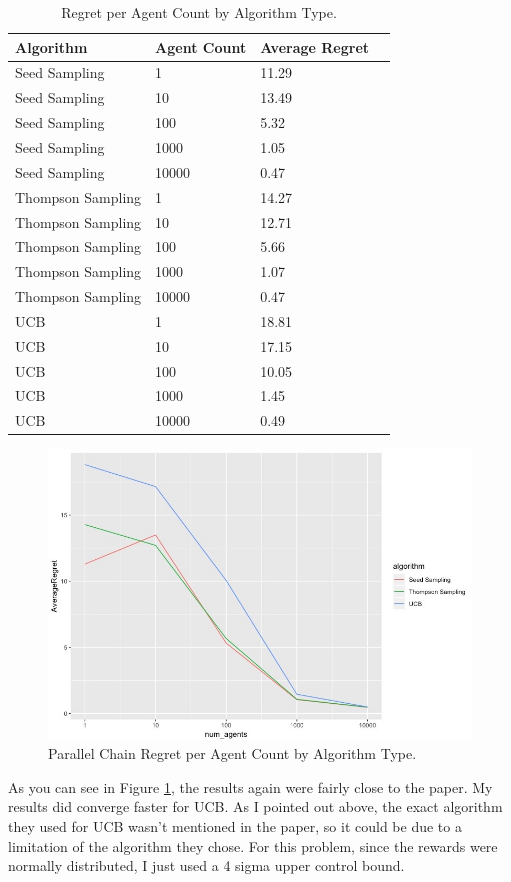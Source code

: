 \documentclass{article}
\begin{document}
\begin{table}[ht]
\caption{Regret per Agent Count by Algorithm Type.}
\label{pc_results_regret_by_algo-table}
\vskip 0.15in
\centering
\begin{tabular}{llll} 
\toprule 
Algorithm     & Agent Count       & Average Regret   \\ 
\midrule 
Seed Sampling     & 1       & 11.29   \\ 
Seed Sampling     & 10    & 13.49 \\ 
Seed Sampling     & 100     & 5.32  \\ 
Seed Sampling     & 1000   & 1.05  \\ 
Seed Sampling     & 10000  & 0.47  \\ 
Thompson Sampling & 1          & 14.27 \\ 
Thompson Sampling & 10       & 12.71   \\ 
Thompson Sampling & 100    & 5.66  \\ 
Thompson Sampling & 1000    & 1.07  \\ 
Thompson Sampling & 10000  & 0.47 \\ 
UCB               & 1         & 18.81  \\ 
UCB               & 10       & 17.15 \\ 
UCB               & 100      & 10.05 \\ 
UCB               & 1000    & 1.45 \\ 
UCB               & 10000  & 0.49      \\ 
\bottomrule 
\end{tabular}
\end{table}


\begin{figure}[htbp!]
  \centering
\includegraphics[scale=.3]{pc_results_regret_by_algo.jpg}

  \caption{Parallel Chain Regret per Agent Count by Algorithm Type.}
 \label{fig:pc_results_regret_by_algo}
\end{figure}
As you can see in Figure  \ref{fig:pc_results_regret_by_algo}, the results again were fairly close to the paper. My results did converge   faster for UCB.  As I pointed out above, the exact algorithm they used for UCB wasn't mentioned in the paper, so it could be due to a limitation of the algorithm they chose. For this problem, since the rewards were normally distributed, I just used a 4 sigma upper control bound.
\end{document}
